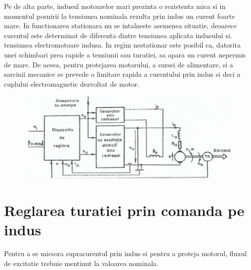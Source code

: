 \documentclass[11pt]{article}
\begin{document}
Pe de alta parte, indusul motoarelor mari prezinta o rezistenta mica si in momentul pornirii la tensiunea nominala rezulta prin indus un curent foarte mare. In functionarea stationara nu se intalneste asemenea situatie, deoarece curentul este determinat de diferenta dintre tensiunea aplicata indusului si. tensiunea electromotoare indusa. In regim nestationar este posibil ca, datorita unei schimbari prea rapide a tensiunii sau turatiei, sa apara un curent nepermis de mare. De aceea, pentru protejarea motorului, a sursei de alimentare, si a sarcinii mecanice se prevede o limitare rapida a curentului prin indus si deci a cuplului electromagnetic dezvoltat de motor.
\begin{figure}[H]
	\centering
	\includegraphics[width=.8\linewidth]{fig7.png}
	\label{fig:test2}
\end{figure}
\section{Reglarea turatiei prin comanda pe indus}
Pentru a se micsora supracurentul prin indus si pentru a proteja motorul, fluxul de excitatie trebuie mentinut la valoarea nominala. 
\end{document}
